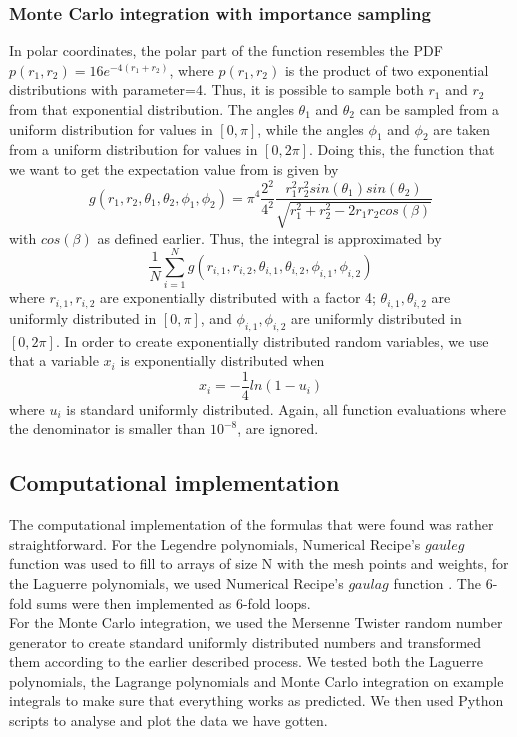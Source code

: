 \documentclass[10pt,a4paper]{article}
\begin{document}
\subsubsection{Monte Carlo integration with importance sampling}
In polar coordinates, the polar part of the function resembles the PDF $p(r_1,r_2)=16e^{-4(r_1+r_2)}$, where $p(r_1,r_2)$ is the product of two exponential distributions with parameter=4. Thus, it is possible to sample both $r_1$ and $r_2$ from that exponential distribution.
The angles $\theta_1$ and $\theta_2$ can be sampled from a uniform distribution for values in $[0,\pi]$, while the angles  $\phi_1$ and $\phi_2$ are taken from a uniform distribution for values in $[0,2\pi]$. Doing this, the function that we want to get the expectation value from is given by
$$g(r_1,r_2,\theta_1,\theta_2,\phi_1,\phi_2)=\pi^4\frac{2^2}{4^2}\frac{r_1^2r_2^2sin(\theta_1)sin(\theta_2)}{\sqrt{r_1^2+r_2^2-2r_1r_2cos(\beta)}}$$
with $cos(\beta)$ as defined earlier.
Thus, the integral is approximated by
$$\frac{1}{N}\sum_{i=1}^{N}g(r_{i,1},r_{i,2},\theta_{i,1},\theta_{i,2},\phi_{i,1},\phi_{i,2})$$
where $r_{i,1},r_{i,2}$ are exponentially distributed with a factor 4;  $\theta_{i,1},\theta_{i,2}$ are uniformly distributed in $[0,\pi]$, and  $\phi_{i,1},\phi_{i,2}$  are uniformly distributed in $[0,2\pi]$. In order to create exponentially distributed random variables, we use that a variable $x_i$ is exponentially distributed when
$$x_i=-\frac{1}{4}ln(1-u_i)$$
where $u_i$ is standard uniformly distributed. Again, all function evaluations where the denominator is smaller than $10^{-8}$, are ignored.
\subsection{Computational implementation}
The computational implementation of the formulas that were found was rather straightforward. For the Legendre polynomials, Numerical Recipe's ${\textit{gauleg}}$ function was used to fill to arrays of size N with the mesh points and weights, for the Laguerre polynomials, we used Numerical Recipe's ${\textit{gaulag}}$ function \cite{press1992numerical}. The 6-fold sums were then implemented as 6-fold loops.\\
For the Monte Carlo integration, we used the Mersenne Twister random number generator to create standard uniformly distributed numbers and transformed them according to the earlier described process. We tested both the Laguerre polynomials, the Lagrange polynomials and Monte Carlo integration on example integrals to make sure that everything works as predicted. We then used Python scripts to analyse and plot the data we have gotten.
\end{document}
